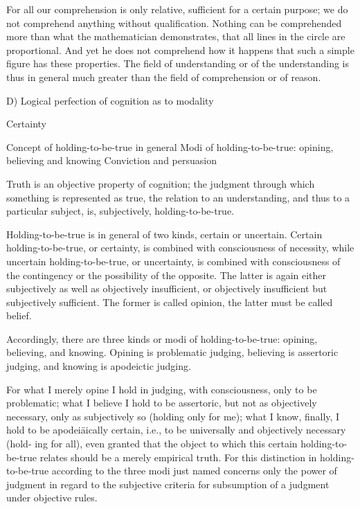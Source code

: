     For all our comprehension is only relative,
    sufficient for a certain purpose;
    we do not comprehend anything without qualification.
    Nothing can be comprehended more than what the mathematician demonstrates,
    that all lines in the circle are proportional.
    And yet he does not comprehend how it happens that such a simple
    figure has these properties.
    The field of understanding or of the understanding is thus in general
    much greater than the field of comprehension or of reason.

    D) Logical perfection of cognition as to modality

    Certainty

        Concept of holding-to-be-true in general
        Modi of holding-to-be-true: opining, believing and knowing
        Conviction and persuasion

    Truth is an objective property of cognition;
    the judgment through which something is represented as true,
    the relation to an understanding, and thus to a particular subject, is,
    subjectively, holding-to-be-true.

    Holding-to-be-true is in general of two kinds, certain or uncertain.
    Certain holding-to-be-true, or certainty, is
    combined with consciousness of necessity,
    while uncertain holding-to-be-true, or uncertainty, is
    combined with consciousness of the contingency
    or the possibility of the opposite.
    The latter is again either subjectively
    as well as objectively insufficient,
    or objectively insufficient but subjectively sufficient.
    The former is called opinion, the latter must be called belief.

    Accordingly, there are three kinds or modi of holding-to-be-true:
    opining, believing, and knowing.
    Opining is problematic judging,
    believing is assertoric judging,
    and knowing is apodeictic judging.

    For what I merely opine I hold in judging, with consciousness, only to be problematic;
    what I believe I hold to be assertoric, but not as objectively necessary, only as
    subjectively so (holding only for me); what I know, finally, I hold to be
    apodeiäically certain, i.e., to be universally and objectively necessary (hold-
    ing for all), even granted that the object to which this certain holding-to-
    be-true relates should be a merely empirical truth. For this distinction in
    holding-to-be-true according to the three modi just named concerns only
    the power of judgment in regard to the subjective criteria for subsumption of
    a judgment under objective rules.

